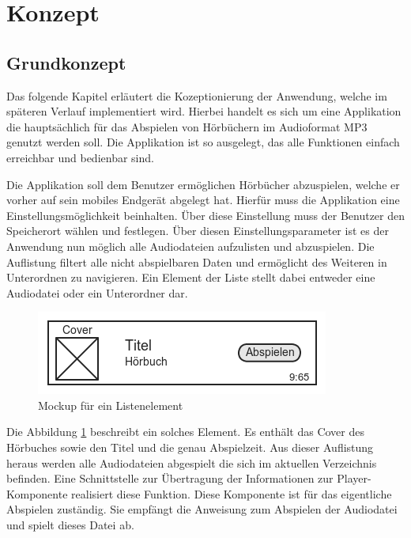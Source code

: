 \section{Konzept}

\subsection{Grundkonzept}

Das folgende Kapitel erläutert die Kozeptionierung der Anwendung, welche im späteren Verlauf implementiert wird. Hierbei handelt es sich um eine Applikation die hauptsächlich für das Abspielen von Hörbüchern im Audioformat MP3 genutzt werden soll. Die Applikation ist so ausgelegt, das alle Funktionen einfach erreichbar und bedienbar sind.

Die Applikation soll dem Benutzer ermöglichen Hörbücher abzuspielen, welche er vorher auf sein mobiles Endgerät abgelegt hat. Hierfür muss die Applikation eine Einstellungsmöglichkeit beinhalten. Über diese Einstellung muss der Benutzer den Speicherort wählen und festlegen. Über diesen Einstellungsparameter ist es der Anwendung nun möglich alle Audiodateien aufzulisten und abzuspielen. Die Auflistung filtert alle nicht abspielbaren Daten und ermöglicht des Weiteren in Unterordnen zu navigieren. Ein Element der Liste stellt dabei entweder eine Audiodatei oder ein Unterordner dar. 

\begin{figure}[h!t]
\begin{center}
\includegraphics[scale=0.8]{images/listitem}
\caption{Mockup für ein Listenelement}
\label{mocklistel}
\end{center}
\end{figure}

Die Abbildung \ref{mocklistel} beschreibt ein solches Element. Es enthält das Cover des Hörbuches sowie den Titel und die genau Abspielzeit. Aus dieser Auflistung heraus werden alle Audiodateien abgespielt die sich im aktuellen Verzeichnis befinden. Eine Schnittstelle zur Übertragung der Informationen zur Player-Komponente realisiert diese Funktion. Diese Komponente ist für das eigentliche Abspielen zuständig. Sie empfängt die Anweisung zum Abspielen der Audiodatei und spielt dieses Datei ab.

